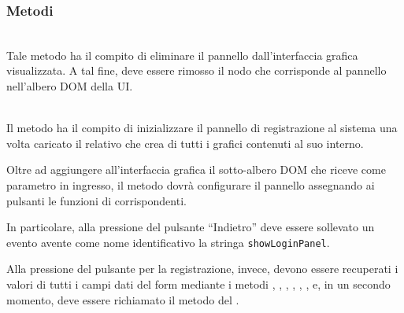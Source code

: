 \subsubsection*{Metodi}
\begin{description}
  \item{}\\
  Tale metodo ha il compito di eliminare il pannello dall’interfaccia grafica visualizzata. A tal fine, deve essere rimosso il nodo che corrisponde al pannello nell’albero DOM della UI\@.
  
  \item{}\\
  	Il metodo ha il compito di inizializzare il pannello di registrazione al sistema una volta caricato il relativo  che crea di tutti i  grafici contenuti al suo interno.
	
	Oltre ad aggiungere all'interfaccia grafica il sotto-albero DOM che riceve come parametro in ingresso, il metodo dovrà configurare il pannello assegnando ai pulsanti le funzioni di  corrispondenti.
	
	In particolare, alla pressione del pulsante ``Indietro'' deve essere sollevato un evento avente come nome identificativo la stringa \verb'showLoginPanel'.
	
  Alla pressione del pulsante per la registrazione, invece, devono essere recuperati i valori di tutti i campi dati del form mediante i metodi , , , , , ,  e, in un secondo momento, deve essere richiamato il metodo  del .

\end{description}

